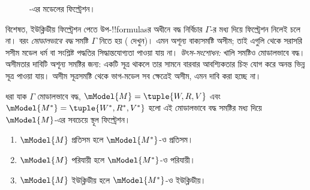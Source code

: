 \documentclass[../../../include/open-logic-section]{subfiles}
\begin{document}
\begin{figure}[ht]
  \centering
  \caption{-এর মডেলের ফিল্ট্রেশন।}
\end{figure}

বিশেষত, ইউক্লিডীয় ফিল্ট্রেশন পেতে উপ-!!{formula}sর অধীনে বদ্ধ নির্বিচার $\Gamma$-র মধ্য দিয়ে ফিল্ট্রেশন নিলেই চলে না। বরং \emph{মোডালভাবে বদ্ধ} সমষ্টি $\Gamma$ নিতে হয় ( দেখুন)। এমন অশূন্য বাক্যসমষ্টি অসীম; তাই এগুলি থেকে সরাসরি সসীম মডেল ধর্ম বা সংশ্লিষ্ট পদ্ধতির সিদ্ধান্তযোগ্যতা পাওয়া যায় না।
\emph{উৎস-সংশোধন:} খালি সমষ্টিও মোডালভাবে বদ্ধ। অসীমতার দাবিটি অশূন্য সমষ্টির জন্য: একটি সূত্র থাকলে তার সামনে বারবার আবশ্যিকতার চিহ্ন যোগ করে অনন্ত ভিন্ন সূত্র পাওয়া যায়। অসীম সূত্রসমষ্টি থেকে ভাগ-মডেল সব ক্ষেত্রেই অসীম, এমন দাবি করা হচ্ছে না।


\begin{thm}
  ধরা যাক $\Gamma$ মোডালভাবে বদ্ধ, $\mModel{M}=\tuple{W,R,V}$ এবং $\mModel{M^*} = \tuple{W^*,R^*,V^*}$ হলো এই মোডালভাবে বদ্ধ সমষ্টির মধ্য দিয়ে $\mModel{M}$-এর সবচেয়ে স্থূল ফিল্ট্রেশন।
  \begin{enumerate}
  \item $\mModel{M}$ প্রতিসম হলে $\mModel{M^*}$-ও প্রতিসম।
  \item $\mModel{M}$ পরিযায়ী হলে $\mModel{M^*}$-ও পরিযায়ী।
  \item $\mModel{M}$ ইউক্লিডীয় হলে $\mModel{M^*}$-ও ইউক্লিডীয়।
  \end{enumerate}
\end{thm}
\end{document}
